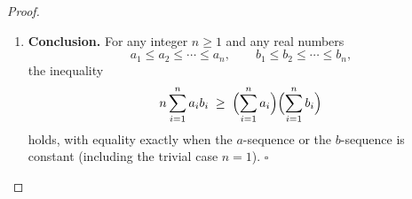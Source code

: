\begin{proof}
\begin{enumerate}
\begin{itemize}
\item \(a_i=a_j\) for all \(i,j\) (the \(a\)-sequence is constant), or
\item \(b_i=b_j\) for all \(i,j\) (the \(b\)-sequence is constant).
\end{itemize}
The case \(n=1\) is included in both possibilities. Hence equality holds \emph{iff} one of the two sequences is constant.

\item \textbf{Conclusion.}  
For any integer \(n\ge1\) and any real numbers
\[
a_{1}\le a_{2}\le\cdots\le a_{n},\qquad
b_{1}\le b_{2}\le\cdots\le b_{n},
\]
the inequality
\[
n\sum_{i=1}^{n} a_i b_i\;\ge\;
\Bigl(\sum_{i=1}^{n} a_i\Bigr)\Bigl(\sum_{i=1}^{n} b_i\Bigr)
\]
holds, with equality exactly when the \(a\)-sequence or the \(b\)-sequence is constant (including the trivial case \(n=1\)). \(\square\)
\end{enumerate}
\end{proof}